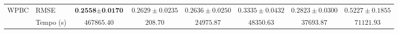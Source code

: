 \begin{landscape}
\begin{table}[h]
\begin{tabular}{l|l|c@{\hskip 5pt}c@{\hskip 5pt}c@{\hskip 5pt}c@{\hskip 5pt}c@{\hskip 5pt}c}
            \midrule
            \multirow{2}{*}{WPBC}   & RMSE & $\textbf{0.2558} \pm \textbf{0.0170}$ & $0.2629 \pm 0.0235$ & $0.2636 \pm 0.0250$ & $0.3335 \pm 0.0432$ & $0.2823 \pm 0.0300$ & $0.5227 \pm 0.1855$ \\
                                    & Tempo (s) & $467865.40$ & $208.70$ & $24975.87$ & $48350.63$ & $37693.87$ & $71121.93$ \\
            \bottomrule
        \end{tabular}
        \begin{center}
        \end{center}
    \end{table}
\end{landscape}
